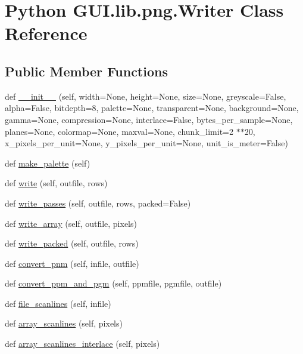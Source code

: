 \hypertarget{class_python_01_g_u_i_1_1lib_1_1png_1_1_writer}{}\section{Python G\+U\+I.\+lib.\+png.\+Writer Class Reference}
\label{class_python_01_g_u_i_1_1lib_1_1png_1_1_writer}
\subsection*{Public Member Functions}
\begin{DoxyCompactItemize}
\item 
def \hyperlink{class_python_01_g_u_i_1_1lib_1_1png_1_1_writer_a5089219af230477fafe85b914e2ad278}{\+\_\+\+\_\+init\+\_\+\+\_\+} (self, width=None, height=None, size=None, greyscale=False, alpha=False, bitdepth=8, palette=None, transparent=None, background=None, gamma=None, compression=None, interlace=False, bytes\+\_\+per\+\_\+sample=None, planes=None, colormap=None, maxval=None, chunk\+\_\+limit=2 $\ast$$\ast$20, x\+\_\+pixels\+\_\+per\+\_\+unit=None, y\+\_\+pixels\+\_\+per\+\_\+unit=None, unit\+\_\+is\+\_\+meter=False)
\item 
def \hyperlink{class_python_01_g_u_i_1_1lib_1_1png_1_1_writer_ae230c94e859c63c11bd9ee6d0ac94c9e}{make\+\_\+palette} (self)
\item 
def \hyperlink{class_python_01_g_u_i_1_1lib_1_1png_1_1_writer_afe46070d1c56d08d18a48774924d1966}{write} (self, outfile, rows)
\item 
def \hyperlink{class_python_01_g_u_i_1_1lib_1_1png_1_1_writer_a9590bc26c068a9a4f6374d0d3246c2a3}{write\+\_\+passes} (self, outfile, rows, packed=False)
\item 
def \hyperlink{class_python_01_g_u_i_1_1lib_1_1png_1_1_writer_a236f3bf09634539c21b4978014adc9b1}{write\+\_\+array} (self, outfile, pixels)
\item 
def \hyperlink{class_python_01_g_u_i_1_1lib_1_1png_1_1_writer_a59b10b0d8ae08b87d807260764a37d8e}{write\+\_\+packed} (self, outfile, rows)
\item 
def \hyperlink{class_python_01_g_u_i_1_1lib_1_1png_1_1_writer_ae37b9a6957f341eac4c52bbfc2fec9a7}{convert\+\_\+pnm} (self, infile, outfile)
\item 
def \hyperlink{class_python_01_g_u_i_1_1lib_1_1png_1_1_writer_a3bccc8e12fde8099327276954f09b382}{convert\+\_\+ppm\+\_\+and\+\_\+pgm} (self, ppmfile, pgmfile, outfile)
\item 
def \hyperlink{class_python_01_g_u_i_1_1lib_1_1png_1_1_writer_a2f504a74306d7bed190719de08eeb272}{file\+\_\+scanlines} (self, infile)
\item 
def \hyperlink{class_python_01_g_u_i_1_1lib_1_1png_1_1_writer_a9477e181c530d49a19817cebc211e2d0}{array\+\_\+scanlines} (self, pixels)
\item 
def \hyperlink{class_python_01_g_u_i_1_1lib_1_1png_1_1_writer_af246a932bce78c224afbffc8e917ac26}{array\+\_\+scanlines\+\_\+interlace} (self, pixels)
\end{DoxyCompactItemize}
